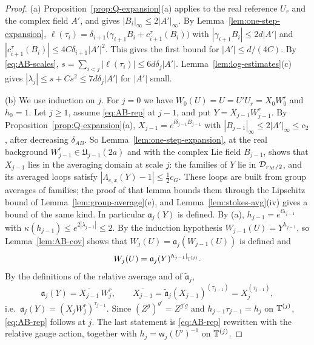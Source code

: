 \begin{proof}
(a) Proposition~\ref{prop:Q-expansion}(a) applies to the real reference $U_r$ and the complex field $A'$, and gives $|B_i|_\infty\le2|A'|_\infty$. By Lemma~\ref{lem:one-step-expansion}, $\ell(\tau_i)=\delta_{i+1}\big(\gamma_{i+1}B_i+c^\tau_{i+1}(B_i)\big)$ with $|\gamma_{i+1}B_i|\le2d|A'|$ and $|c^\tau_{i+1}(B_i)|\le4C\delta_{i+1}|A'|^2$. This gives the first bound for $|A'|\le d/(4C)$. By \eqref{eq:AB-scales}, $s=\sum_{i<j}|\ell(\tau_i)|\le6d\delta_j|A'|$. Lemma~\ref{lem:log-estimates}(c) gives $|\lambda_j|\le s+Cs^2\le7d\delta_j|A'|$ for $|A'|$ small.

(b) We use induction on $j$. For $j=0$ we have $W_0(U)=U=U'U_r=X_0W^r_0$ and $h_0=1$. Let $j\ge1$, assume \eqref{eq:AB-rep} at $j-1$, and put $Y=X_{j-1}W^r_{j-1}$. By Proposition~\ref{prop:Q-expansion}(a), $X_{j-1}=e^{\ii\delta_{j-1}B_{j-1}}$ with $|B_{j-1}|_\infty\le2|A'|_\infty\le c_2$, after decreasing $\delta_{AB}$. So Lemma~\ref{lem:one-step-expansion}, at the real background $W^r_{j-1}\in\mathfrak U_{j-1}(2a)$ and with the complex Lie field $B_{j-1}$, shows that $X_{j-1}$ lies in the averaging domain at scale $j$: the families of $Y$ lie in $\mathcal D_{r_M/2}$, and its averaged loops satisfy $|\Lambda_{c,x}(Y)-1|\le\frac12c_G$. These loops are built from group averages of families; the proof of that lemma bounds them through the Lipschitz bound of Lemma~\ref{lem:group-average}(e), and Lemma~\ref{lem:stokes-avg}(iv) gives a bound of the same kind. In particular $\mathfrak a_j(Y)$ is defined. By (a), $h_{j-1}=e^{\ii\lambda_{j-1}}$ with $\kappa(h_{j-1})\le e^{2|\lambda_{j-1}|}\le2$. By the induction hypothesis $W_{j-1}(U)=Y^{h_{j-1}}$, so Lemma~\ref{lem:AB-cov} shows that $W_j(U)=\mathfrak a_j(W_{j-1}(U))$ is defined and
\[
W_j(U)=\mathfrak a_j(Y)^{h_{j-1}|_{\mathbb T^{(j)}}} .
\]
By the definitions of the relative average and of $\tilde{\mathfrak a}_j$,
\[
\mathfrak a_j(Y)=\overline{X_{j-1}}\,W^r_j,\qquad \overline{X_{j-1}}=\tilde{\mathfrak a}_j(X_{j-1})^{(\tau_{j-1})}=X_j^{(\tau_{j-1})},
\]
i.e.\ $\mathfrak a_j(Y)=(X_jW^r_j)^{\tau_{j-1}}$. Since $(Z^g)^{g'}=Z^{g'g}$ and $h_{j-1}\tau_{j-1}=h_j$ on $\mathbb T^{(j)}$, \eqref{eq:AB-rep} follows at $j$. The last statement is \eqref{eq:AB-rep} rewritten with the relative gauge action, together with $h_j=\mathsf w_j(U')^{-1}$ on $\mathbb T^{(j)}$.
\end{proof}

